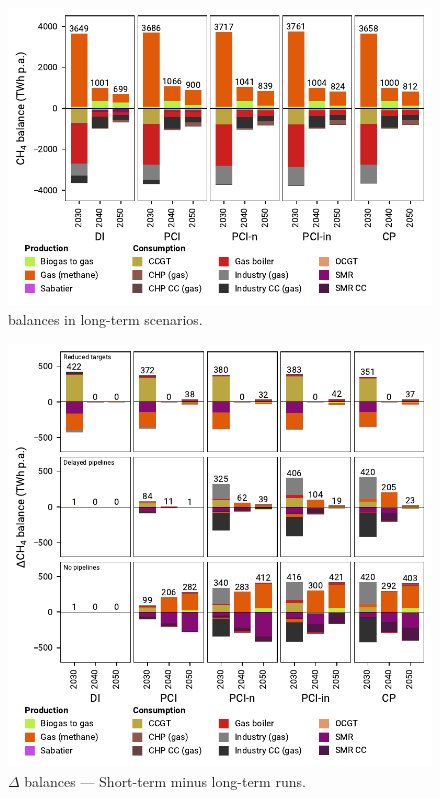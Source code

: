 \documentclass[preprint,12pt,sort&compress]{elsarticle}
\begin{document}
\begin{figure}[htbp]
  \centering
  \includegraphics[width=\textwidth]{balances_overview_gas}
  \caption{ balances in long-term scenarios.}
  \label{fig:balances_overview_gas}
\end{figure}

\begin{figure}[htbp]
  \centering
  \includegraphics[width=\textwidth]{balances_overview_extended_gas}
  \caption{$\Delta$ balances --- Short-term minus long-term runs.}
  \label{fig:balances_overview_extended_gas}
\end{figure}
\end{document}
